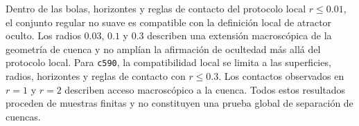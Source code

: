 Dentro de las bolas, horizontes y reglas de contacto del protocolo local
\(r\leq0.01\), el conjunto regular no suave es compatible con la definición
local de atractor oculto. Los radios \(0.03\), \(0.1\) y \(0.3\) describen una
extensión macroscópica de la geometría de cuenca y no amplían la afirmación de
ocultedad más allá del protocolo local. Para \texttt{c590}, la compatibilidad
local se limita a las superficies, radios, horizontes y reglas de contacto con
\(r\leq0.3\). Los contactos observados en \(r=1\) y \(r=2\) describen acceso
macroscópico a la cuenca. Todos estos resultados proceden de muestras finitas
y no constituyen una prueba global de separación de cuencas.
\fi
